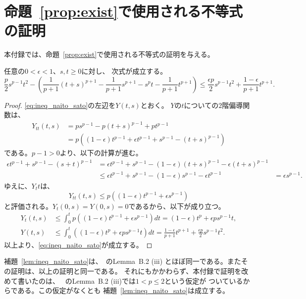 
\section{命題~\ref{prop:exist}で使用される不等式の証明}

本付録では、命題~\ref{prop:exist}で使用される不等式の証明を与える。

\begin{lem} \label{lem:ineq_naito_sato}
 任意の$0 < \epsilon < 1$、$s, t \geq 0$に対し、
 次式が成立する。
 \begin{equation}
  \frac{p}{2}s^{p-1}t^2 - 
   \left( \frac{1}{p+1}(t+s)^{p+1} -
    \frac{1}{p+1}s^{p+1} - s^pt - \frac{1}{p+1}t^{p+1}
   \right) \leq \frac{\epsilon p}{2} s^{p-1}
   t^2 + \frac{1-\epsilon}{p+1} t^{p+1}. \label{eq:ineq_naito_sato}
 \end{equation}
\end{lem}
 
\begin{proof}
 \eqref{eq:ineq_naito_sato}の左辺を$Y(t, s)$とおく。
 $Y$の$t$についての$2$階偏導関数は、
 \begin{align*}
  Y_{tt}(t, s) &= p s^{p-1} - p(t+s)^{p-1} + pt^{p-1} \\
  &= p \left( (1- \epsilon) t^{p-1} + \epsilon t^{p-1} + s^{p-1} -
  (t+s)^{p-1} \right)
 \end{align*}
 である。$p - 1 > 0$より、以下の計算が進む。
 \begin{align*}
  \epsilon t^{p-1} + s^{p-1} - (s+t)^{p-1} &= 
  \epsilon t^{p-1} + s^{p-1} - (1-\epsilon)(t+s)^{p-1} - \epsilon
  (t+s)^{p-1} \\
  & \leq \epsilon t^{p-1} + s^{p-1} - (1-\epsilon) s^{p-1} - \epsilon
  t^{p-1} &= \epsilon s^{p-1}.
 \end{align*}
 ゆえに、$Y_tt$は、
 \[
  Y_{tt}(t, s) \leq p \left( (1-\epsilon) t^{p-1} + \epsilon s^{p-1} \right)
 \]
 と評価される。$Y_t(0, s) = Y(0, s) = 0$であるから、以下が成り立つ。
 \begin{align*}
  Y_t(t, s) &\leq \int_0^t  p \left( (1-\epsilon) t^{p-1} + \epsilon
  s^{p-1} \right) dt = (1 - \epsilon) t^p + \epsilon p s^{p-1} t, \\
  Y(t, s) &\leq \int_0^t \left( (1 - \epsilon) t^p + \epsilon p
  s^{p-1} t \right)dt = \frac{1 -\epsilon}{p+1} t^{p+1} +
  \frac{\epsilon p}{2}s^{p-1}t^2.
 \end{align*}
 以上より、\eqref{eq:ineq_naito_sato}が成立する。\qedhere
\end{proof}

補題~\ref{lem:ineq_naito_sato}は、\cite{MR2886160}~のLemma~B.2 (iii)
とほぼ同一である。またその証明は、以上の証明と同一である。
それにもかかわらず、本付録で証明を改めて書いたのは、
\cite{MR2886160}~のLemma~B.2 (iii)では$1 < p \leq 2$という仮定が
ついているからである。この仮定がなくとも
補題~\ref{lem:ineq_naito_sato}は成立する。

